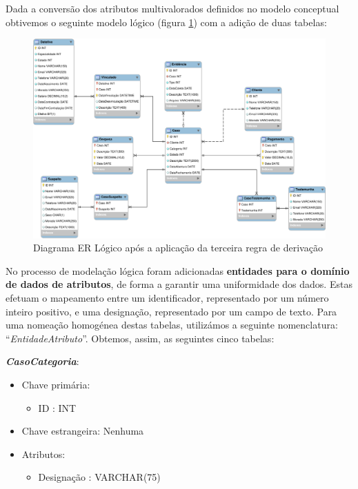 \documentclass[a4paper,12pt]{scrreprt}
\begin{document}
        \vspace{0.5cm}

        Dada a conversão dos atributos multivalorados definidos no modelo conceptual obtivemos o seguinte modelo lógico (figura \ref{fig:4.3}) com a adição de duas tabelas:

        \clearpage
        \begin{figure}[!ht]
            \centering
            \includegraphics[scale=1, angle=270]{images/modelo_logico/regra3.pdf}
            \caption{Diagrama ER Lógico após a aplicação da terceira regra de derivação}
            \label{fig:4.3}
        \end{figure}
    

        \clearpage

        No processo de modelação lógica foram adicionadas \textbf{entidades para o domínio de dados de atributos}, de forma a garantir uma uniformidade dos dados. Estas efetuam o mapeamento entre um identificador, representado por um número inteiro positivo, e uma designação, representado por um campo de texto. Para uma nomeação homogénea destas tabelas, utilizámos a seguinte nomenclatura: “\textit{EntidadeAtributo}”. Obtemos, assim, as seguintes cinco tabelas:

        \textbf{\textit{CasoCategoria}}:
        \begin{itemize}
            \item Chave primária:
                \begin{itemize}
                    \item ID : INT
                \end{itemize}
            \item Chave estrangeira: Nenhuma
            \item Atributos:
                \begin{itemize}
                    \item Designação : VARCHAR(75)
                \end{itemize}
        \end{itemize}
\end{document}
